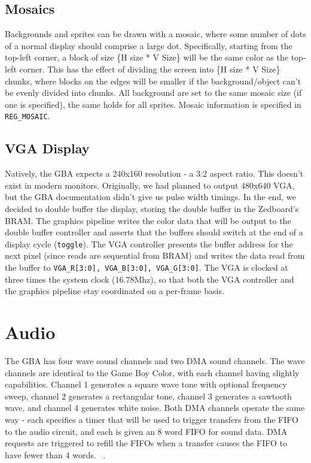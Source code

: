 \documentclass[11pt,a4paper,draft]{article}
\begin{document}
	\subsection{Mosaics}
	Backgrounds and sprites can be drawn with a mosaic, where some number of dots of a normal display should comprise a large dot. Specifically, starting from the top-left corner, a block of size \{H size * V Size\} will be the same color as the top-left corner. This has the effect of dividing the screen into \{H size * V Size\} chunks, where blocks on the edges will be smaller if the background/object can't be evenly divided into chunks. All background are set to the same mosaic size (if one is specified), the same holds for all sprites. Mosaic information is specified in \texttt{REG\_MOSAIC}.\cite{GBAManual}
	
	\subsection{VGA Display}
	Natively, the GBA expects a 240x160 resolution - a 3:2 aspect ratio. This doesn't exist in modern monitors. Originally, we had planned to output 480x640 VGA, but the GBA documentation didn't give us pulse width timings. In the end, we decided to double buffer the display, storing the double buffer in the Zedboard's BRAM. The graphics pipeline writes the color data that will be output to the double buffer controller and asserts that the buffers should switch at the end of a display cycle (\texttt{toggle}). The VGA controller presents the buffer address for the next pixel (since reads are sequential from BRAM) and writes the data read from the buffer to \texttt{VGA\_R[3:0], VGA\_B[3:0], VGA\_G[3:0]}. The VGA is clocked at three times the system clock (16.78Mhz), so that both the VGA controller and the graphics pipeline stay coordinated on a per-frame basis. 
	
	\section{Audio}
	The GBA has four wave sound channels and two DMA sound channels. The wave channels are identical to the Game Boy Color, with each channel having slightly capabilities. Channel 1 generates a square wave tone with optional frequency sweep, channel 2 generates a rectangular tone, channel 3 generates a sawtooth wave, and channel 4 generates white noise. Both DMA channels operate the same way - each specifies a timer that will be used to trigger transfers from the FIFO to the audio circuit, and each is given an 8 word FIFO for sound data. DMA requests are triggered to refill the FIFOs when a transfer causes the FIFO to have fewer than 4 words. ~\cite{GBAManual}.
	
\end{document}
